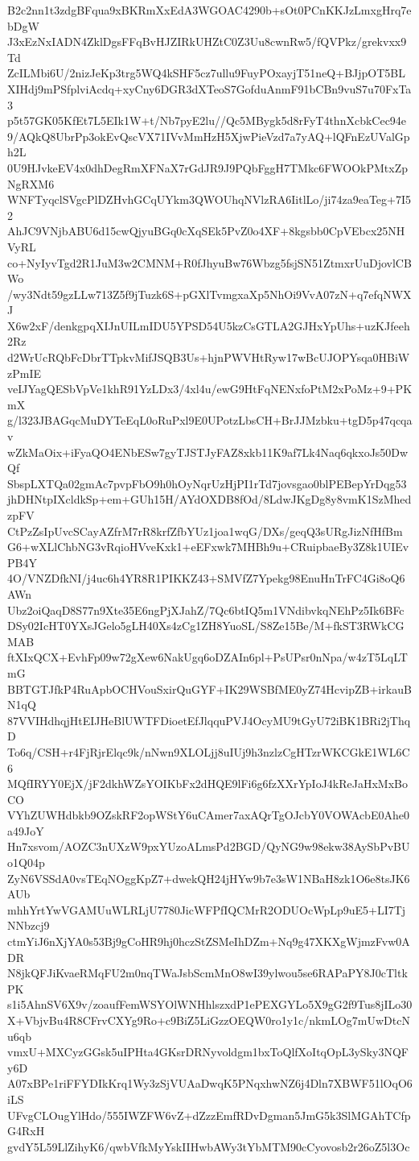 B2c2nn1t3zdgBFqua9xBKRmXxEdA3WGOAC4290b+sOt0PCnKKJzLmxgHrq7ebDgW
J3xEzNxIADN4ZklDgsFFqBvHJZIRkUHZtC0Z3Uu8cwnRw5/fQVPkz/grekvxx9Td
ZcILMbi6U/2nizJeKp3trg5WQ4kSHF5cz7ullu9FuyPOxayjT51neQ+BJjpOT5BL
XIHdj9mPSfplviAcdq+xyCny6DGR3dXTeoS7GofduAnmF91bCBn9vuS7u70FxTa3
p5t57GK05KfEt7L5EIk1W+t/Nb7pyE2lu//Qc5MBygk5d8rFyT4thnXcbkCec94e
9/AQkQ8UbrPp3okEvQscVX71IVvMmHzH5XjwPieVzd7a7yAQ+lQFnEzUValGph2L
0U9HJvkeEV4x0dhDegRmXFNaX7rGdJR9J9PQbFggH7TMkc6FWOOkPMtxZpNgRXM6
WNFTyqclSVgcPlDZHvhGCqUYkm3QWOUhqNVlzRA6IitlLo/ji74za9eaTeg+7I52
AhJC9VNjbABU6d15cwQjyuBGq0cXqSEk5PvZ0o4XF+8kgsbb0CpVEbcx25NHVyRL
co+NyIyvTgd2R1JuM3w2CMNM+R0fJhyuBw76Wbzg5fsjSN51ZtmxrUuDjovlCBWo
/wy3Ndt59gzLLw713Z5f9jTuzk6S+pGXlTvmgxaXp5NhOi9VvA07zN+q7efqNWXJ
X6w2xF/denkgpqXIJnUILmIDU5YPSD54U5kzCsGTLA2GJHxYpUhs+uzKJfeeh2Rz
d2WrUcRQbFcDbrTTpkvMifJSQB3Us+hjnPWVHtRyw17wBcUJOPYsqa0HBiWzPmIE
veIJYagQESbVpVe1khR91YzLDx3/4xl4u/ewG9HtFqNENxfoPtM2xPoMz+9+PKmX
g/l323JBAGqcMuDYTeEqL0oRuPxl9E0UPotzLbsCH+BrJJMzbku+tgD5p47qcqav
wZkMaOix+iFyaQO4ENbESw7gyTJSTJyFAZ8xkb11K9af7Lk4Naq6qkxoJs50DwQf
SbspLXTQa02gmAc7pvpFbO9h0hOyNqrUzHjPI1rTd7jovsgao0blPEBepYrDqg53
jhDHNtpIXcldkSp+em+GUh15H/AYdOXDB8fOd/8LdwJKgDg8y8vmK1SzMhedzpFV
CtPzZsIpUvcSCayAZfrM7rR8krfZfbYUz1joa1wqG/DXs/geqQ3sURgJizNfHfBm
G6+wXLlChbNG3vRqioHVveKxk1+eEFxwk7MHBh9u+CRuipbaeBy3Z8k1UIEvPB4Y
4O/VNZDfkNI/j4uc6h4YR8R1PIKKZ43+SMVfZ7Ypekg98EnuHnTrFC4Gi8oQ6AWn
Ubz2oiQaqD8S77n9Xte35E6ngPjXJahZ/7Qc6btIQ5m1VNdibvkqNEhPz5Ik6BFc
DSy02IcHT0YXsJGelo5gLH40Xs4zCg1ZH8YuoSL/S8Ze15Be/M+fkST3RWkCGMAB
ftXIxQCX+EvhFp09w72gXew6NakUgq6oDZAIn6pl+PsUPsr0nNpa/w4zT5LqLTmG
BBTGTJfkP4RuApbOCHVouSxirQuGYF+IK29WSBfME0yZ74HcvipZB+irkauBN1qQ
87VVIHdhqjHtEIJHeBlUWTFDioetEfJlqquPVJ4OcyMU9tGyU72iBK1BRi2jThqD
To6q/CSH+r4FjRjrElqc9k/nNwn9XLOLjj8uIUj9h3nzlzCgHTzrWKCGkE1WL6C6
MQfIRYY0EjX/jF2dkhWZsYOIKbFx2dHQE9lFi6g6fzXXrYpIoJ4kReJaHxMxBoCO
VYhZUWHdbkb9OZskRF2opWStY6uCAmer7axAQrTgOJcbY0VOWAcbE0Ahe0a49JoY
Hn7xsvom/AOZC3nUXzW9pxYUzoALmsPd2BGD/QyNG9w98ekw38AySbPvBUo1Q04p
ZyN6VSSdA0vsTEqNOggKpZ7+dwekQH24jHYw9b7e3sW1NBaH8zk1O6e8tsJK6AUb
mhhYrtYwVGAMUuWLRLjU7780JicWFPfIQCMrR2ODUOcWpLp9uE5+LI7TjNNbzcj9
ctmYiJ6nXjYA0s53Bj9gCoHR9hj0hczStZSMeIhDZm+Nq9g47XKXgWjmzFvw0ADR
N8jkQFJiKvaeRMqFU2m0nqTWaJsbScmMnO8wI39ylwou5se6RAPaPY8J0cTltkPK
s1i5AhnSV6X9v/zoaufFemWSYOlWNHhlszxdP1ePEXGYLo5X9gG2f9Tus8jILo30
X+VbjvBu4R8CFrvCXYg9Ro+c9BiZ5LiGzzOEQW0ro1y1c/nkmLOg7mUwDtcNu6qb
vmxU+MXCyzGGsk5uIPHta4GKsrDRNyvoldgm1bxToQlfXoItqOpL3ySky3NQFy6D
A07xBPe1riFFYDIkKrq1Wy3zSjVUAaDwqK5PNqxhwNZ6j4Dln7XBWF51lOqO6iLS
UFvgCLOugYlHdo/555IWZFW6vZ+dZzzEmfRDvDgman5JmG5k3SlMGAhTCfpG4RxH
gvdY5L59LlZihyK6/qwbVfkMyYskIIHwbAWy3tYbMTM90cCyovosb2r26oZ5l3Oc
